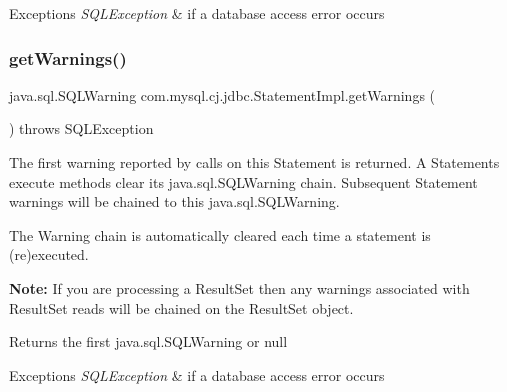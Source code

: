 \begin{DoxyExceptions}{Exceptions}
{\em S\+Q\+L\+Exception} & if a database access error occurs \\
\hline
\end{DoxyExceptions}
\mbox{\label{classcom_1_1mysql_1_1cj_1_1jdbc_1_1_statement_impl_aeeda73d9ee01ed8c74d90c4014614412}} 
\subsubsection{\texorpdfstring{get\+Warnings()}{getWarnings()}}
{\footnotesize\ttfamily java.\+sql.\+S\+Q\+L\+Warning com.\+mysql.\+cj.\+jdbc.\+Statement\+Impl.\+get\+Warnings (\begin{DoxyParamCaption}{ }\end{DoxyParamCaption}) throws S\+Q\+L\+Exception}

The first warning reported by calls on this Statement is returned. A Statement\textquotesingle{}s execute methods clear its java.\+sql.\+S\+Q\+L\+Warning chain. Subsequent Statement warnings will be chained to this java.\+sql.\+S\+Q\+L\+Warning.

The Warning chain is automatically cleared each time a statement is (re)executed. 

{\bfseries Note\+:} If you are processing a Result\+Set then any warnings associated with Result\+Set reads will be chained on the Result\+Set object. 

\begin{DoxyReturn}{Returns}
the first java.\+sql.\+S\+Q\+L\+Warning or null
\end{DoxyReturn}

\begin{DoxyExceptions}{Exceptions}
{\em S\+Q\+L\+Exception} & if a database access error occurs \\
\hline
\end{DoxyExceptions}
\mbox{\label{classcom_1_1mysql_1_1cj_1_1jdbc_1_1_statement_impl_a424894ae04079fd072300d7a54de6243}} 

